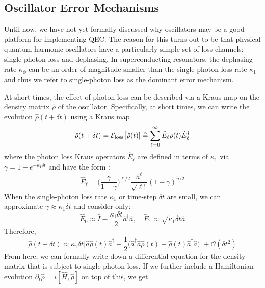 \subsection{Oscillator Error Mechanisms}

Until now, we have not yet formally discussed why oscillators may be a good platform for implementing QEC. The reason for this turns out to be that physical quantum harmonic oscillators have a particularly simple set of loss channels: single-photon loss and dephasing. In superconducting resonators, the dephasing rate $\kappa_\phi$ can be an order of magnitude smaller than the single-photon loss rate $\kappa_1$ and thus we refer to single-photon loss as the dominant error mechanism. 

At short times, the effect of photon loss can be described via a Kraus map on the density matrix $\hat{\rho}$ of the oscillator. Specifically, at short times, we can write the evolution $\hat{\rho}(t + \delta t)$ using a Kraus map
\begin{equation}
    \hat{\rho}(t + \delta t) = \mathcal{E}_{\rm loss}\big[\hat{\rho}(t)] \triangleq \sum_{\ell = 0}^\infty  \hat{E}_\ell \rho(t)  \hat{E}_\ell^\dagger
\end{equation}
where the photon loss Kraus operators $ \hat{E}_\ell$ are defined in terms of $\kappa_1$ via $\gamma = 1 - e^{-\kappa_1 \delta t}$ and have the form \cite{albert2018performance-and-structure}:
\begin{equation}
    \hat{E}_\ell = \bigg(\frac{\gamma}{1 - \gamma}\bigg)^{\ell/2} \frac{\hat{a}^\ell}{\sqrt{\ell !}} (1 - \gamma)^{\hat{n}/2}
\end{equation}
When the single-photon loss rate $\kappa_1$ or time-step $\delta t$ are small, we can approximate $\gamma \approx \kappa_1 \delta t$ and consider only:
\begin{equation}
    \hat{E}_0 \approx \hat{I} - \frac{\kappa_1 \delta t}{2}\hat{a}^\dagger\hat{a}, \quad \hat{E}_1 \approx \sqrt{\kappa_1 \delta t}\hat{a}
\end{equation}
Therefore, 
\begin{equation}
    \hat{\rho}(t + \delta t) \approx \kappa_1\delta t\bigg[\hat{a}\hat{\rho}(t)\hat{a}^\dagger - \frac{1}{2}\Big(\hat{a}^\dagger\hat{a}\hat{\rho}(t) + \hat{\rho}(t)\hat{a}^\dagger\hat{a}\Big)\bigg] + \mathcal{O}(\delta t^2)
\end{equation}
From here, we can formally write down a differential equation for the density matrix that is subject to single-photon loss. If we further include a Hamiltonian evolution $\partial_t \hat{\rho} = i[\hat{H}, \hat{\rho}]$ on top of this, we get
